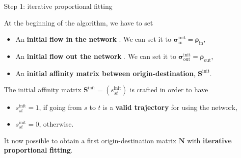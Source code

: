 \documentclass[10pt]{beamer}
\newcommand{\imp}[1]{\textbf{\color{cyan}#1}}
\begin{document}
	\begin{frame}{Step 1: iterative proportional fitting}
		
		At the beginning of the algorithm, we have to set 
		\begin{itemize}
			\item An \imp{initial flow in the network }. We can set it to $\bm{\sigma}^\text{init}_\text{in} = \bm{\rho}_\text{in}$,
			\item An \imp{initial flow out the network }. We can set it to $\bm{\sigma}^\text{init}_\text{out} = \bm{\rho}_\text{out}$,
			\item An \imp{initial affinity matrix between origin-destination}, $\mathbf{S}^\text{init}$.
		\end{itemize}  
	
		The initial affinity matrix $\mathbf{S}^\text{init} = (s^\text{init}_{st})$ is crafted in order to have
		\begin{itemize}
			\item $s^\text{init}_{st} = 1$, if going from $s$ to $t$ is a \imp{valid trajectory} for using the network,
			\item $s^\text{init}_{st} = 0$, otherwise.
		\end{itemize}
		
		It now possible to obtain a first origin-destination matrix $\mathbf{N}$ with \imp{iterative proportional fitting}.
		
	\end{frame}
	
	
\end{document}
